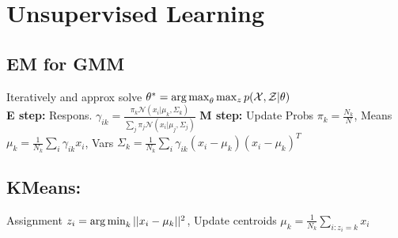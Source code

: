 \section*{Unsupervised Learning}
\subsection*{EM for GMM}
Iteratively and approx solve $\theta^*=\operatorname*{arg\,max}_\theta \max_z p(\mathcal X, \mathcal Z|\theta)$\\
\textbf{E step:} Respons. $\gamma_{ik}=\frac{\pi_k\mathcal N(x_i|\mu_k,\Sigma_k)}{\sum_j\pi_j\mathcal N(x_i|\mu_j,\Sigma_j)}$
\textbf{M step:} Update Probs $\pi_k=\frac{N_k}{N}$, Means $\mu_k=\frac{1}{N_k}\sum_i\gamma_{ik}x_i$, Vars $\Sigma_k=\frac{1}{N_k}\sum_i\gamma_{ik}(x_i-\mu_k)(x_i-\mu_k)^T$\\
\subsection*{KMeans:} Assignment $z_i=\operatorname*{arg\,min}_k ||x_i-\mu_k||^2$, Update centroids $\mu_k=\frac{1}{N_k}\sum_{i:z_i=k} x_i$